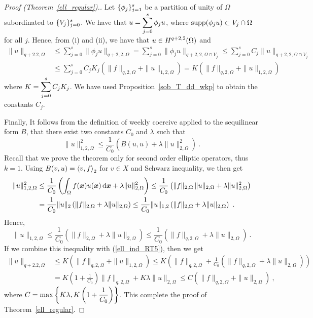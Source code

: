 \begin{proof}[Proof (Theorem~\ref{ell_regular}).]
 Let $\displaystyle \{\phi_j\}_{j=1}^s$ be a partition of unity of
$\Omega$ subordinated to $\displaystyle \{ V_j \}_{j=0}^s$.
We have that $\displaystyle u = \sum_{j=0}^s \phi_j u$, where
$\operatorname{supp} (\phi_j u) \subset V_j \cap \Omega$ for all $j$.  Hence,
from (i) and (ii), we have that $\displaystyle u\in H^{q+2,2}(\Omega)$ and
\begin{align}
\|u\|_{q+2.2,\Omega} &\leq \sum_{j=0}^s \| \phi_j u\|_{q+2,2,\Omega}
= \sum_{j=0}^s \| \phi_j u\|_{q+2,2,\Omega \cap V_j}
\leq \sum_{j=0}^s C_j \|u\|_{q+2,2,\Omega \cap V_j} \nonumber \\
&\leq \sum_{j=0}^s C_j K_j \left( \|f\|_{q,2,\Omega} + \|u\|_{1,2,\Omega} \right)
= K \left( \|f\|_{q,2,\Omega} + \|u\|_{1,2,\Omega} \right)  \label{ell_ind_RT5}
\end{align}
where $\displaystyle K = \sum_{j=0}^s C_j K_j$.  We have used
Proposition~\ref{sob_T_dd_wkp} to obtain the constants $C_j$.

 Finally, It follows from the definition of weekly coercive
applied to the sequilinear form $B$, that there exist two constants
$C_0$ and $\lambda$ such that
\[
\|u \|_{1,2,\Omega}^2
\leq \frac{1}{C_0} \left( B(u,u) + \lambda \|u\|_{2,\Omega}^2\right) \ .
\]
Recall that we prove the theorem only for second order elliptic
operators, thus $k=1$.  Using $B(v,u) = \left\langle{v} , {f}\right\rangle_2$ for $v\in X$ and
Schwarz inequality, we then get
\begin{align*}
\|u \|_{1,2,\Omega}^2 &\leq
\frac{1}{C_0} \left( \int_{\Omega} f({\bm{x}}) u({\bm{x}}) \,\mathrm{d}{{\bm{x}}}
+ \lambda \|u\|_{2,\Omega}^2\right)
\leq \frac{1}{C_0} \left( \|f\|_{2,\Omega} \, \| u \|_{2,\Omega}
+\lambda \|u\|_{2,\Omega}^2\right)\\
&= \frac{1}{C_0} \|u\|_2 \left( \|f\|_{2,\Omega} +\lambda \|u\|_{2,\Omega}\right)
\leq \frac{1}{C_0} \|u\|_{1,2} \left( \|f\|_{2,\Omega}
+\lambda \|u\|_{2,\Omega}\right) \ .
\end{align*}
Hence,
\[
\|u \|_{1,2,\Omega} \leq \frac{1}{C_0} \left( \|f\|_{2,\Omega}
  +\lambda \|u\|_{2,\Omega} \right)
\leq \frac{1}{C_0} \left( \|f\|_{q,2,\Omega} +\lambda \|u\|_{2,\Omega} \right) \ .
\]
If we combine this inequality with (\ref{ell_ind_RT5}), then we get
\begin{align*}
\|u\|_{q+2.2,\Omega} &\leq 
K \left( \|f\|_{q,2,\Omega} + \|u\|_{1,2,\Omega} \right)
\leq K \left( \|f\|_{q,2,\Omega} + \frac{1}{C_0} \left( \|f\|_{q,2,\Omega}
+\lambda \|u\|_{2,\Omega}\right) \right) \\
&= K \left(1+ \frac{1}{C_0} \right) \|f\|_{q,2,\Omega}
+ K \lambda \|u\|_{2,\Omega}
\leq C \left( \|f\|_{q,2,\Omega} + \|u\|_{2,\Omega}\right) \ ,
\end{align*}
where $\displaystyle C = \max\left\{K\lambda,
K \left(1+ \frac{1}{C_0}\right)\right\}$.
This complete the proof of Theorem~\ref{ell_regular}.
\end{proof}

